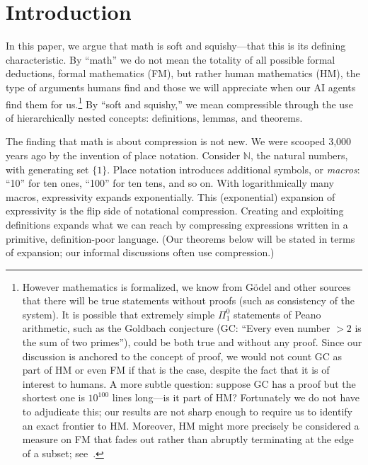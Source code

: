 \documentclass[12pt]{amsart}
\theoremstyle{definition}
\theoremstyle{remark}
\begin{document}
\section{Introduction}

In this paper, we argue that math is soft and squishy---that this is its defining characteristic.
By ``math'' we do not mean the totality of all possible formal deductions, formal mathematics (FM), but rather human mathematics (HM), the type of arguments humans find and those we will appreciate when our AI agents find them for us.\footnote{However mathematics is formalized, we know from G\"odel and other sources that there will be true statements without proofs (such as consistency of the system).
It is possible that extremely simple $\Pi^0_1$ statements of Peano arithmetic, such as the Goldbach conjecture (GC: ``Every even number ${}>2$ is the sum of two primes''), could be both true and without any proof.
Since our discussion is anchored to the concept of proof, we would not count GC as part of HM or even FM if that is the case, despite the fact that it is of interest to humans.
A more subtle question: suppose GC has a proof but the shortest one is $10^{100}$ lines long---is it part of HM\@?
Fortunately we do not have to adjudicate this; our results are not sharp enough to require us to identify an exact frontier to HM\@.
Moreover, HM might more precisely be considered a measure on FM that fades out rather than abruptly terminating at the edge of a subset; see~\cite{BDF}.}
By ``soft and squishy,'' we mean compressible through the use of hierarchically nested concepts: definitions, lemmas, and theorems.

The finding that math is about compression is not new.
We were scooped 3,000 years ago by the invention of place notation.
Consider $\mathbb{N}$, the natural numbers, with generating set $\{1\}$.
Place notation introduces additional symbols, or \emph{macros}: ``10'' for ten ones, ``100'' for ten tens, and so on.
With logarithmically many macros, expressivity expands exponentially.
This (exponential) expansion of expressivity is the flip side of notational compression.
Creating and exploiting definitions expands what we can reach by compressing expressions written in a primitive, definition-poor language.
(Our theorems below will be stated in terms of expansion; our informal discussions often use compression.)
\end{document}
